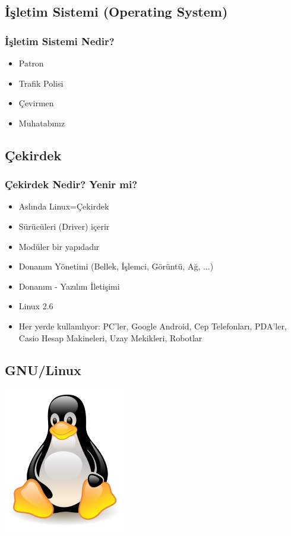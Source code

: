\documentclass{beamer}
\begin{document}
	\subsection{İşletim Sistemi (Operating System)}
		\begin{frame}
			\frametitle{İşletim Sistemi Nedir?}
			\begin{itemize}
			 \item Patron
			 \item Trafik Polisi 
			 \item Çevirmen
			 \item Muhatabınız 
			\end{itemize}

		\end{frame}

	\subsection{Çekirdek}
		\begin{frame}
		 	\frametitle{Çekirdek Nedir? Yenir mi?}
			\begin{itemize}
			 \item Aslında Linux=Çekirdek
			 \item Sürücüleri (Driver)  içerir
			 \item Modüler bir yapıdadır
			 \item Donanım Yönetimi (Bellek, İşlemci, Görüntü, Ağ, ...)
			 \item Donanım - Yazılım İletişimi			 
			 \item Linux 2.6
			 \item Her yerde kullanılıyor: PC'ler, Google Android, Cep Telefonları, PDA'ler, Casio Hesap Makineleri, Uzay Mekikleri, Robotlar
			 

			\end{itemize}
			
		\end{frame}

	\subsection{GNU/Linux}
		\begin{frame}
		\begin{center}
 		 \includegraphics{linux.png}
		\end{center}
		\end{frame}
\end{document}
